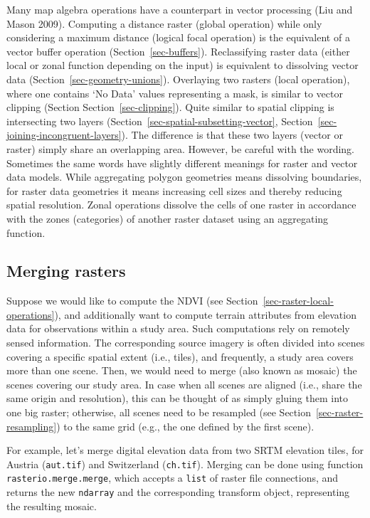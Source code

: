 \documentclass[
  letterpaper,
]{krantz}
\begin{document}
Many map algebra operations have a counterpart in vector processing (Liu
and Mason 2009). Computing a distance raster (global operation) while
only considering a maximum distance (logical focal operation) is the
equivalent of a vector buffer operation (Section~\ref{sec-buffers}).
Reclassifying raster data (either local or zonal function depending on
the input) is equivalent to dissolving vector data
(Section~\ref{sec-geometry-unions}). Overlaying two rasters (local
operation), where one contains `No Data' values representing a mask, is
similar to vector clipping (Section Section~\ref{sec-clipping}). Quite
similar to spatial clipping is intersecting two layers
(Section~\ref{sec-spatial-subsetting-vector},
Section~\ref{sec-joining-incongruent-layers}). The difference is that
these two layers (vector or raster) simply share an overlapping area.
However, be careful with the wording. Sometimes the same words have
slightly different meanings for raster and vector data models. While
aggregating polygon geometries means dissolving boundaries, for raster
data geometries it means increasing cell sizes and thereby reducing
spatial resolution. Zonal operations dissolve the cells of one raster in
accordance with the zones (categories) of another raster dataset using
an aggregating function.

\subsection{Merging rasters}\label{sec-merging-rasters}

Suppose we would like to compute the NDVI (see
Section~\ref{sec-raster-local-operations}), and additionally want to
compute terrain attributes from elevation data for observations within a
study area. Such computations rely on remotely sensed information. The
corresponding source imagery is often divided into scenes covering a
specific spatial extent (i.e., tiles), and frequently, a study area
covers more than one scene. Then, we would need to merge (also known as
mosaic) the scenes covering our study area. In case when all scenes are
aligned (i.e., share the same origin and resolution), this can be
thought of as simply gluing them into one big raster; otherwise, all
scenes need to be resampled (see Section~\ref{sec-raster-resampling}) to
the same grid (e.g., the one defined by the first scene).

For example, let's merge digital elevation data from two SRTM elevation
tiles, for Austria
(\texttt{\textquotesingle{}aut.tif\textquotesingle{}}) and Switzerland
(\texttt{\textquotesingle{}ch.tif\textquotesingle{}}). Merging can be
done using function \texttt{rasterio.merge.merge}, which accepts a
\texttt{list} of raster file connections, and returns the new
\texttt{ndarray} and the corresponding transform object, representing
the resulting mosaic.
\end{document}
